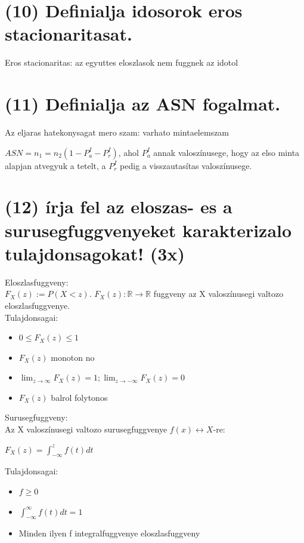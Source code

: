 \documentclass[12p]{article}
\begin{document}
\section{(10) Definialja idosorok eros stacionaritasat.}

Eros stacionaritas: az egyuttes eloszlasok nem
fuggnek az idotol

\section{(11) Definialja az ASN fogalmat.}

Az eljaras hatekonysagat mero szam: varhato mintaelemszam

$ASN = n_1 = n_2(1 - P^{I}_a - P^I_r)$, ahol $P_a^I$ annak valoszínusege, hogy az elso minta alapjan atvegyuk a tetelt, a $P_r^I$ pedig a visszautasítas valoszínusege.

\section{(12) írja fel az eloszas- es a surusegfuggvenyeket karakterizalo tulajdonsagokat! (3x)}

Eloszlasfuggveny:\\
$F_X(z):=P(X<z)$. $F_X(z):\mathbb{R}\rightarrow\mathbb{R}$ fuggveny az X valoszínusegi valtozo eloszlasfuggvenye.\\
Tulajdonsagai:

\begin{itemize}
	\item $0 \leq F_X(z) \leq 1$
	\item $F_X(z)$ monoton no
	\item $\lim_{z \rightarrow \infty} F_X(z) = 1; \lim_{z \rightarrow -\infty} F_X(z) = 0$
	\item $F_X(z)$ balrol folytonos
\end{itemize}

Surusegfuggveny:\\
Az X valoszínusegi valtozo surusegfuggvenye $f(x) \leftrightarrow X$-re:

$F_X(z) = \int_{-\infty}^z f(t) dt$

Tulajdonsagai:
\begin{itemize}
	\item $f \geq 0$
	\item $\int_{-\infty}^{\infty} f(t) dt = 1$
	\item Minden ilyen f integralfuggvenye eloszlasfuggveny
\end{itemize}
\end{document}
